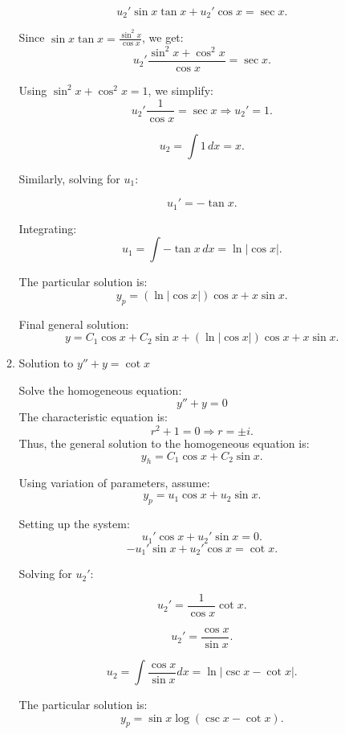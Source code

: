 \documentclass[12pt]{article}
\begin{document}
\begin{enumerate}
\begin{enumerate}
        \[
        u_2' \sin x \tan x + u_2' \cos x = \sec x.
        \]

        Since \( \sin x \tan x = \frac{\sin^2 x}{\cos x} \), we get:
        \[
        u_2' \frac{\sin^2 x + \cos^2 x}{\cos x} = \sec x.
        \]

        Using \( \sin^2 x + \cos^2 x = 1 \), we simplify:
        \[
        u_2' \frac{1}{\cos x} = \sec x \Rightarrow u_2' = 1.
        \]

        \[
        u_2 = \int 1 \, dx = x.
        \]

        Similarly, solving for \( u_1 \):

        \[
        u_1' = -\tan x.
        \]

        Integrating:
        \[
        u_1 = \int -\tan x \,dx = \ln |\cos x|.
        \]

        The particular solution is:
        \[
        y_p = (\ln |\cos x|) \cos x + x \sin x.
        \]

        Final general solution:
        \[
        y = C_1 \cos x + C_2 \sin x + (\ln |\cos x|) \cos x + x \sin x.
        \]

    

    \item Solution to \( y'' + y = \cot x \)

    
        Solve the homogeneous equation:
        \[
        y'' + y = 0
        \]
        The characteristic equation is:
        \[
        r^2 + 1 = 0 \Rightarrow r = \pm i.
        \]
        Thus, the general solution to the homogeneous equation is:
        \[
        y_h = C_1 \cos x + C_2 \sin x.
        \]

        Using variation of parameters, assume:
        \[
        y_p = u_1 \cos x + u_2 \sin x.
        \]

        Setting up the system:
        \[
        u_1' \cos x + u_2' \sin x = 0.
        \]
        \[
        - u_1' \sin x + u_2' \cos x = \cot x.
        \]

        Solving for \( u_2' \):

        \[
        u_2' = \frac{1}{\cos x} \cot x.
        \]

        \[
        u_2' = \frac{\cos x}{\sin x}.
        \]

        \[
        u_2 = \int \frac{\cos x}{\sin x} dx = \ln |\csc x - \cot x|.
        \]

        The particular solution is:
        \[
        y_p = \sin x \log (\csc x - \cot x).
        \]


\end{enumerate}
\end{enumerate}
\end{document}
